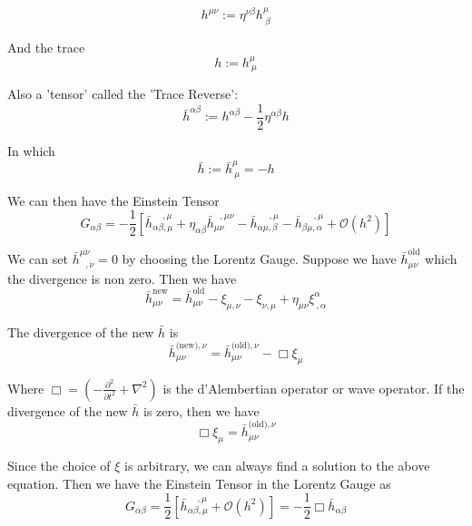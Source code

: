 \documentclass{article}
\begin{document}
\begin{equation}
    h^{\mu\nu}:=\eta^{\nu\beta}h^\mu_{~\beta}
\end{equation}

And the trace
\begin{equation}
    h:=h^\mu_{~\mu}
\end{equation}

Also a 'tensor' called the 'Trace Reverse':
\begin{equation}
    \bar{h}^{\alpha\beta}:=h^{\alpha\beta}-\frac{1}{2}\eta^{\alpha\beta}h
\end{equation}

In which
\begin{equation}
    \bar{h}:=\bar{h}^\mu_{~\mu}=-h
\end{equation}

We can then have the Einstein Tensor
\begin{equation}
    G_{\alpha\beta}=-\frac{1}{2}\left[\bar{h}_{\alpha\beta,\mu}^{~~~~~,\mu}+\eta_{\alpha\beta}\bar{h}_{\mu\nu}^{~~~,\mu\nu}-\bar{h}_{\alpha\mu,\beta}^{~~~~~~,\mu}-\bar{h}_{\beta\mu,\alpha}^{~~~~~~,\mu}+\mathcal{O}(h^2)\right]
\end{equation}

We can set $\bar{h}^{\mu\nu}_{~~~,\nu}=0$ by choosing the Lorentz Gauge. Suppose we have $\bar{h}^{\text{old}}_{\mu\nu}$ which the divergence is non zero. Then we have
\begin{equation}
    \bar{h}^{\text{new}}_{\mu\nu}=\bar{h}^{\text{old}}_{\mu\nu}-\xi_{\mu,\nu}-\xi_{\nu,\mu}+\eta_{\mu\nu}\xi^\alpha_{~,\alpha}
\end{equation}

The divergence of the new $\bar{h}$ is
\begin{equation}
    \bar{h}^{\text{(new)},\nu}_{\mu\nu}=\bar{h}^{\text{(old)},\nu}_{\mu\nu}-\Box\xi_\mu
\end{equation}

Where $\Box = \left(-\frac{\partial^2}{\partial t^2}+\nabla^2\right)$ is the d'Alembertian operator or wave operator. If the divergence of the new $\bar{h}$ is zero, then we have
\begin{equation}
    \Box\xi_\mu=\bar{h}^{\text{(old)},\nu}_{\mu\nu}
\end{equation}

Since the choice of $\xi$ is arbitrary, we can always find a solution to the above equation. Then we have the Einstein Tensor in the Lorentz Gauge as
\begin{equation}
    G_{\alpha\beta}=\frac{1}{2}\left[\bar{h}_{\alpha\beta,\mu}^{~~~~~,\mu}+\mathcal{O}(h^2)\right]=-\frac{1}{2}\Box\bar{h}_{\alpha\beta}
\end{equation}
\end{document}
